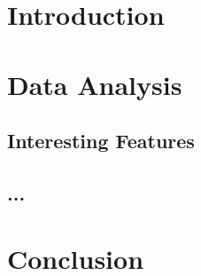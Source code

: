 \chapter{Introduction}
\chapter{Data Analysis}

\section*{Interesting Features}
\section*{...}

\cite{gsa-skript}

\chapter{Conclusion}